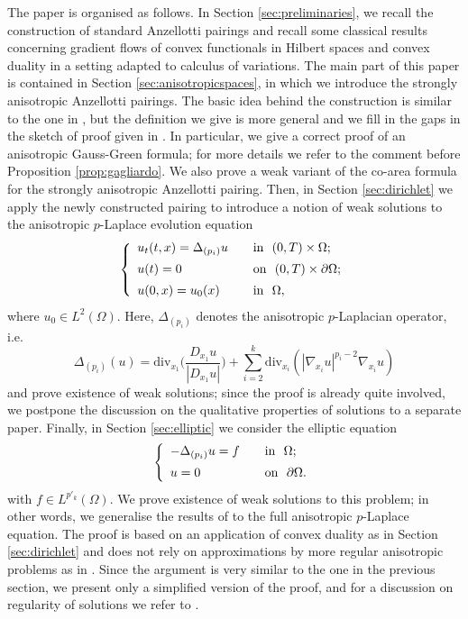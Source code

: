 \documentclass[reqno,12pt]{amsart}
\numberwithin{equation}{section}
\begin{document}
The paper is organised as follows. In Section \ref{sec:preliminaries}, we recall the construction of standard Anzellotti pairings and recall some classical results concerning gradient flows of convex functionals in Hilbert spaces and convex duality in a setting adapted to calculus of variations. The main part of this paper is contained in Section \ref{sec:anisotropicspaces}, in which we introduce the strongly anisotropic Anzellotti pairings. The basic idea behind the construction is similar to the one in \cite{MRST}, but the definition we give is more general and we fill in the gaps in the sketch of proof given in \cite{MRST}. In particular, we give a correct proof of an anisotropic Gauss-Green formula; for more details we refer to the comment before Proposition \ref{prop:gagliardo}. We also prove a weak variant of the co-area formula for the strongly anisotropic Anzellotti pairing. Then, in Section \ref{sec:dirichlet} we apply the newly constructed pairing to introduce a notion of weak solutions to the anisotropic $p$-Laplace evolution equation 
\begin{equation}
\left\{ \begin{array}{lll} u_t (t,x) = \Delta_{(p_i)} u   \quad &\hbox{in} \ \ (0, T) \times \Omega; \\[5pt] u(t) = 0 \quad &\hbox{on} \ \ (0, T) \times  \partial\Omega; \\[5pt] u(0,x) = u_0(x) \quad & \hbox{in} \ \  \Omega, \end{array} \right.
\end{equation}
where $u_0 \in L^2(\Omega)$. Here, $\Delta_{(p_i)}$ denotes the anisotropic $p$-Laplacian operator, i.e.
\begin{equation}
\Delta_{(p_i)}(u) = \mathrm{div}_{x_1} \bigg( \frac{D_{x_1} u}{|D_{x_1} u|} \bigg) + \sum_{i = 2}^k \mathrm{div}_{x_i} (|\nabla_{x_i} u|^{p_i - 2} \nabla_{x_i} u)
\end{equation}
and prove existence of weak solutions; since the proof is already quite involved, we postpone the discussion on the qualitative properties of solutions to a separate paper. Finally, in Section \ref{sec:elliptic} we consider the elliptic equation
\begin{equation}
\left\{ \begin{array}{lll} -\Delta_{(p_i)} u = f   \quad &\hbox{in} \ \ \Omega; \\[5pt] u = 0 \quad &\hbox{on} \ \ \partial\Omega.
\end{array} \right.
\end{equation}
with $f \in L^{p'_k}(\Omega)$. We prove existence of weak solutions to this problem; in other words, we generalise the results of \cite{MRST} to the full anisotropic $p$-Laplace equation. The proof is based on an application of convex duality as in Section \ref{sec:dirichlet} and does not rely on approximations by more regular anisotropic problems as in \cite{MRST}. Since the argument is very similar to the one in the previous section, we present only a simplified version of the proof, and for a discussion on regularity of solutions we refer to \cite{MRST}.
\end{document}
